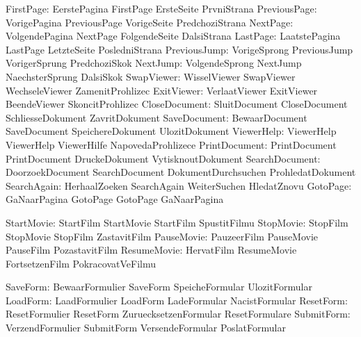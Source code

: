          FirstPage:  EerstePagina      FirstPage            ErsteSeite
                     PrvniStrana
      PreviousPage:  VorigePagina      PreviousPage         VorigeSeite
                     PredchoziStrana
          NextPage:  VolgendePagina    NextPage             FolgendeSeite
                     DalsiStrana
          LastPage:  LaatstePagina     LastPage             LetzteSeite
                     PosledniStrana
      PreviousJump:  VorigeSprong      PreviousJump         VorigerSprung
                     PredchoziSkok
          NextJump:  VolgendeSprong    NextJump             NaechsterSprung
                     DalsiSkok
        SwapViewer:  WisselViewer      SwapViewer           WechseleViewer
                     ZamenitProhlizec
        ExitViewer:  VerlaatViewer     ExitViewer           BeendeViewer
                     SkoncitProhlizec
     CloseDocument:  SluitDocument     CloseDocument        SchliesseDokument
                     ZavritDokument
      SaveDocument:  BewaarDocument    SaveDocument         SpeichereDokument
                     UlozitDokument
        ViewerHelp:  ViewerHelp        ViewerHelp           ViewerHilfe
                     NapovedaProhlizece
     PrintDocument:  PrintDocument     PrintDocument        DruckeDokument
                     VytisknoutDokument
    SearchDocument:  DoorzoekDocument  SearchDocument       DokumentDurchsuchen
                     ProhledatDokument
       SearchAgain:  HerhaalZoeken     SearchAgain          WeiterSuchen
                     HledatZnovu
          GotoPage:  GaNaarPagina      GotoPage             GotoPage %
                     GaNaarPagina %

        StartMovie:  StartFilm         StartMovie           StartFilm
                     SpustitFilmu
         StopMovie:  StopFilm          StopMovie            StopFilm
                     ZastavitFilm
        PauseMovie:  PauzeerFilm       PauseMovie           PauseFilm
                     PozastavitFilm
       ResumeMovie:  HervatFilm        ResumeMovie          FortsetzenFilm
                     PokracovatVeFilmu

          SaveForm:  BewaarFormulier   SaveForm             SpeicheFormular
                     UlozitFormular
          LoadForm:  LaadFormulier     LoadForm             LadeFormular
                     NacistFormular
         ResetForm:  ResetFormulier    ResetForm            ZuruecksetzenFormular
                     ResetFormulare
        SubmitForm:  VerzendFormulier  SubmitForm           VersendeFormular
                     PoslatFormular

